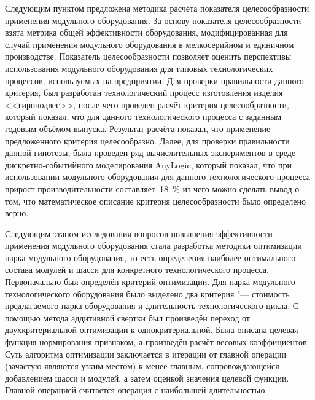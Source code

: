 Следующим пунктом предложена методика расчёта показателя целесообразности применения модульного оборудования. За основу показателя целесообразности взята метрика общей эффективности оборудования, модифицированная для случай применения модульного оборудования в мелкосерийном и единичном производстве. Показатель целесообразности позволяет оценить перспективы использования модульного оборудования для типовых технологических процессов, используемых на предприятии. Для проверки правильности данного критерия, был разработан технологический процесс изготовления изделия <<гироподвес>>, после чего проведен расчёт критерия целесообразности, который показал, что для данного технологического процесса с заданным годовым объёмом выпуска. Результат расчёта показал, что применение предложенного критерия целесообразно. Далее, для проверки правильности данной гипотезы, была проведен ряд вычислительных экспериментов в среде дискретно-событийного моделирования AnyLogic, который показал, что при использовании модульного оборудования для данного технологического процесса прирост производительности составляет~\SI{18}{\percent} из чего можно сделать вывод о том, что математическое описание критерия целесообразности было определено верно.

Следующим этапом исследования вопросов повышения эффективности применения модульного оборудования стала разработка методики оптимизации парка модульного оборудования, то есть определения наиболее оптимального состава модулей и шасси для конкретного технологического процесса. Первоначально был определён критерий оптимизации. Для парка модульного технологического оборудования было выделено два критерия "--- стоимость предлагаемого парка оборудования и длительность технологического цикла. С помощью метода аддитивной свертки был произведён переход от двухкритериальной оптимизации к однокритериальной. Была описана целевая функция нормирования признаком, а произведён расчёт весовых коэффициентов. Суть алгоритма оптимизации заключается в итерации от главной операции (зачастую являются узким местом)  к менее главным, сопровождающейся добавлением шасси и модулей, а затем оценкой значения целевой функции. Главной операцией считается операция с наибольшей длительностью. 

\FloatBarrier